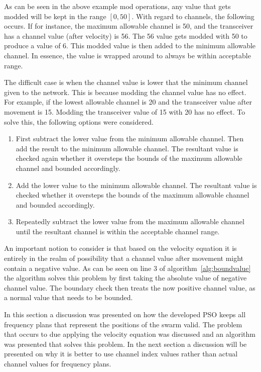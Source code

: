 As can be seen in the above example mod operations, any value that gets modded will be kept in the range $[0,50]$. With regard to channels, the following occurs. If for instance, the maximum allowable channel is 50, and the transceiver has a channel value (after velocity) is 56. The 56 value gets modded with 50 to produce a value of 6. This modded value is then added to the minimum allowable channel. In essence, the value is wrapped around to always be within acceptable range. 

The difficult case is when the channel value is lower that the minimum channel given to the network. This is because modding the channel value has no effect. For example, if the lowest allowable channel is 20 and the transceiver value after movement is 15.
Modding the transceiver value of 15 with 20 has no effect. To solve this, the following options were considered.

\begin{enumerate}
\item First subtract the lower value from the minimum allowable channel. Then add the result to the minimum allowable channel. The resultant value is checked again whether it oversteps the bounds of the maximum allowable channel and bounded accordingly.
\item Add the lower value to the minimum allowable channel. The resultant value is checked whether it oversteps the bounds of the maximum allowable channel and bounded accordingly.
\item Repeatedly subtract the lower value from the maximum allowable channel until the resultant channel is within the acceptable channel range.
\end{enumerate}

An important notion to consider is that based on the velocity equation it is entirely in the realm of possibility that a channel value after movement might contain a negative value. As can be seen on line 3 of algorithm~\ref{alg:boundvalue} the algorithm solves this problem by first taking the absolute value of negative channel value. The boundary check then treats the now positive channel value, as a normal value that needs to be bounded.

In this section a discussion was presented on how the developed PSO keeps all frequency plans that represent the positions of the swarm valid. The problem that occurs to due applying the velocity equation was discussed and an algorithm was presented that solves this problem. In the next section a discussion will be presented on why it is better to use channel index values rather than actual channel values for frequency plans. 
